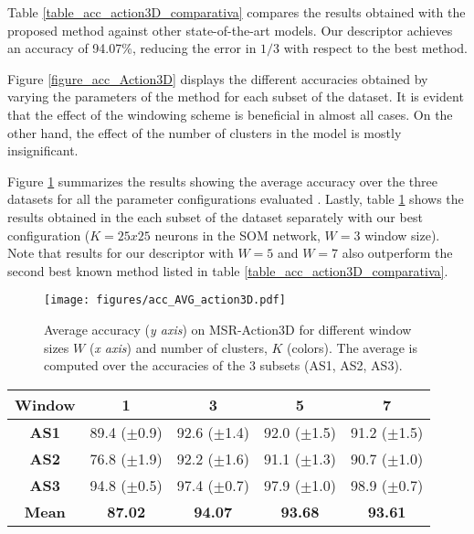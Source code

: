 \documentclass{fcs}
\begin{document}
Table \ref{table_acc_action3D_comparativa} compares the results obtained with the proposed method against other state-of-the-art models. Our descriptor achieves an accuracy of 94.07\%, reducing the error in $1/3$ with respect to the best method. 




Figure \ref{figure_acc_Action3D} displays the different accuracies obtained by varying the parameters of the method for each subset of the dataset. It is evident that the effect of the windowing scheme is beneficial in almost all cases. On the other hand, the effect of the number of clusters in the model is mostly insignificant.


Figure \ref{figure_acc_AVG_Action3D} summarizes the results showing the average accuracy over the three datasets for all the parameter configurations evaluated . Lastly, table \ref{table_acc_action3D_SOM25} shows the results obtained in the each subset of the dataset separately with our best configuration  ($K=25x25$ neurons in the SOM network, $W=3$ window size). Note that results for our descriptor with $W=5$ and $W=7$ also outperform the second best known method listed in table \ref{table_acc_action3D_comparativa}.
 


 
\begin{figure}
\texttt{[image: figures/acc\_AVG\_action3D.pdf]}
\centering
\caption{ Average accuracy (\textit{y axis}) on MSR-Action3D for different window sizes $W$ (\textit{x axis}) and number of clusters, $K$ (colors). The average is computed over the accuracies of the 3 subsets (AS1, AS2, AS3).}
\label{figure_acc_AVG_Action3D}
\end{figure} 
 


\begin{table}
\begin{footnotesize}
\begin{tabular}{ | c | c | c | c | c | } 
\hline
\rowcolor{lightgray}	
\textbf{Window}	& 1 & 3 & 5 & 7 \\
\hline
\textbf{AS1}	& 89.4 ($\pm$0.9) &	92.6 ($\pm$1.4)&	92.0 ($\pm$1.5)&	91.2 ($\pm$1.5)\\
\hline
\textbf{AS2}	& 76.8 ($\pm$1.9)&	92.2 ($\pm$1.6)&	91.1 ($\pm$1.3)&	90.7 ($\pm$1.0)\\
\hline
\textbf{AS3}	& 94.8 ($\pm$0.5)&	97.4 ($\pm$0.7)&	97.9 ($\pm$1.0)&	98.9 ($\pm$0.7)\\
\hline
\hline
\textbf{Mean} & \textbf{87.02} &	\textbf{94.07} &	\textbf{93.68} &	\textbf{93.61} \\
\hline
\end{tabular}
\label{table_acc_action3D_SOM25}
\end{footnotesize}
\end{table}
\end{document}
